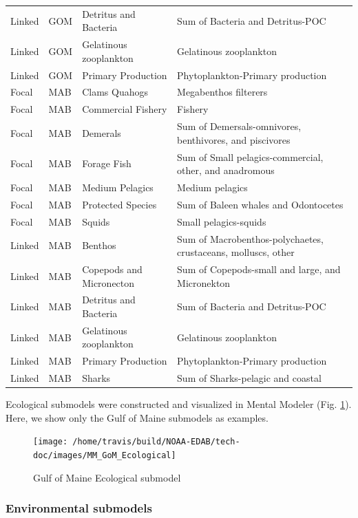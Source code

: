 \documentclass[
]{book}
\begin{document}
\begin{landscape}
\begin{table}
\begin{tabular}[t]{llll}
Linked & GOM & Detritus and Bacteria & Sum of Bacteria and Detritus-POC\\
Linked & GOM & Gelatinous zooplankton & Gelatinous zooplankton\\
Linked & GOM & Primary Production & Phytoplankton-Primary production\\
\addlinespace
Focal & MAB & Clams Quahogs & Megabenthos filterers\\
Focal & MAB & Commercial Fishery & Fishery\\
Focal & MAB & Demerals & Sum of Demersals-omnivores, benthivores, and piscivores\\
Focal & MAB & Forage Fish & Sum of Small pelagics-commercial, other, and anadromous\\
Focal & MAB & Medium Pelagics & Medium pelagics\\
\addlinespace
Focal & MAB & Protected Species & Sum of Baleen whales and Odontocetes\\
Focal & MAB & Squids & Small pelagics-squids\\
Linked & MAB & Benthos & Sum of Macrobenthos-polychaetes, crustaceans, molluscs, other\\
Linked & MAB & Copepods and Micronecton & Sum of Copepods-small and large, and Micronekton\\
Linked & MAB & Detritus and Bacteria & Sum of Bacteria and Detritus-POC\\
\addlinespace
Linked & MAB & Gelatinous zooplankton & Gelatinous zooplankton\\
Linked & MAB & Primary Production & Phytoplankton-Primary production\\
Linked & MAB & Sharks & Sum of Sharks-pelagic and coastal\\
\bottomrule
\end{tabular}
\end{table}
\end{landscape}

Ecological submodels were constructed and visualized in Mental Modeler (Fig. \ref{fig:draftGOMeco}). Here, we show only the Gulf of Maine submodels as examples.

\begin{figure}
\texttt{[image: /home/travis/build/NOAA-EDAB/tech-doc/images/MM\_GoM\_Ecological]} \caption{Gulf of Maine Ecological submodel}\label{fig:draftGOMeco}
\end{figure}

\hypertarget{environmental-submodels-2}{%
\subsubsection{Environmental submodels}\label{environmental-submodels-2}}
\end{document}

